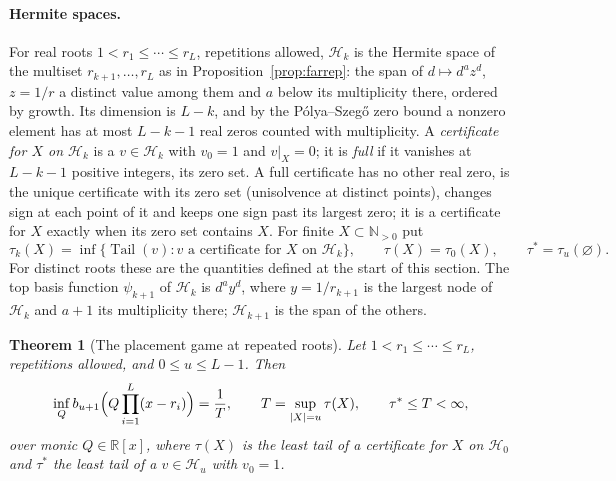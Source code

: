 \documentclass[11pt]{article}
\newtheorem{theorem}{Theorem}[section]
\theoremstyle{definition}
\theoremstyle{plain}
\newcommand{\R}{\mathbb R}
\newcommand{\N}{\mathbb N}
\DeclareMathOperator{\Tail}{Tail}
\begin{document}
\paragraph{Hermite spaces.}  For real roots
$1<r_1\le\cdots\le r_L$, repetitions allowed, $\mathcal H_k$ is the Hermite
space of the multiset $r_{k+1},\ldots,r_L$ as in
Proposition~\ref{prop:farrep}: the span of $d\mapsto d^az^d$, $z=1/r$ a
distinct value among them and $a$ below its multiplicity there, ordered by
growth.  Its dimension is $L-k$, and by the P\'olya--Szeg\H o zero bound a
nonzero element has at most $L-k-1$ real zeros counted with multiplicity.
A \emph{certificate for $X$ on $\mathcal H_k$} is a $v\in\mathcal H_k$ with
$v_0=1$ and $v|_X=0$; it is \emph{full} if it vanishes at $L-k-1$ positive
integers, its zero set.  A full certificate has no other real zero, is the
unique certificate with its zero set (unisolvence at distinct points),
changes sign at each point of it and keeps one sign past its largest zero; it
is a certificate for $X$ exactly when its zero set contains $X$.  For finite $X\subset\N_{>0}$ put
\[
  \tau_k(X)=\inf\{\Tail(v):v\text{ a certificate for }X\text{ on }\mathcal H_k\},
  \qquad \tau(X)=\tau_0(X),\qquad \tau^*=\tau_u(\varnothing).
\]
For distinct roots these are the quantities defined at the start of this section.  The top basis function $\psi_{k+1}$ of $\mathcal H_k$ is
$d^ay^d$, where $y=1/r_{k+1}$ is the largest node of $\mathcal H_k$ and
$a+1$ its multiplicity there; $\mathcal H_{k+1}$ is the span of the others.

\begin{theorem}[The placement game at repeated roots]\label{thm:valuerep}
Let $1<r_1\le\cdots\le r_L$, repetitions allowed, and $0\le u\le L-1$.  Then
\[
  \inf_Qb_{u+1}\Bigl(Q\prod_{i=1}^L(x-r_i)\Bigr)=\frac1T,
  \qquad T=\sup_{|X|=u}\tau(X),\qquad \tau^*\le T<\infty,
\]
over monic $Q\in\R[x]$, where $\tau(X)$ is the least tail of a certificate
for $X$ on $\mathcal H_0$ and $\tau^*$ the least tail of a $v\in\mathcal H_u$
with $v_0=1$.
\end{theorem}
\end{document}
